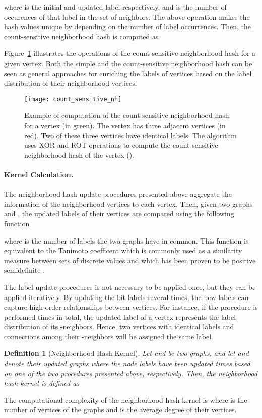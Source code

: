 \documentclass[twoside,11pt]{article}
\newtheorem{definition}{Definition}
\begin{document}
where  is the initial and updated label respectively, and  is the number of occurences of that label in the set of neighbors.
The above operation makes the hash values unique by depending on the number of label occurrences.
Then, the count-sensitive neighborhood hash is computed as

Figure~\ref{fig:count_sensitive_nh} illustrates the operations of the count-sensitive neighborhood hash for a given vertex.
Both the simple and the count-sensitive neighborhood hash can be seen as general approaches for enriching the labels of vertices based on the label distribution of their neighborhood vertices.

\begin{figure}[t]
  \centering
  \texttt{[image: count\_sensitive\_nh]}
  \caption{Example of computation of the count-sensitive neighborhood hash for a vertex (in green). The vertex has three adjacent vertices (in red). Two of these three vertices have identical labels. The algorithm uses XOR and ROT operations to compute the count-sensitive neighborhood hash of the vertex ().}
  \label{fig:count_sensitive_nh}
\end{figure}

\paragraph{Kernel Calculation.}
The neighborhood hash update procedures presented above aggregate the information of the neighborhood vertices to each vertex.
Then, given two graphs  and , the updated labels of their vertices are compared using the following function

where  is the number of labels the two graphs have in common.
This function is equivalent to the Tanimoto coefficent which is commonly used as a similarity measure between sets of discrete values and which has been proven to be positive semidefinite .

The label-update procedures is not necessary to be applied once, but they can be applied iteratively.
By updating the bit labels several times, the new labels can capture high-order relationships between vertices.
For instance, if the procedure is performed  times in total, the updated label  of a vertex  represents the label distribution of its -neighbors.
Hence, two vertices  with identical labels and connections among their -neighbors will be assigned the same label.

\begin{definition}[Neighborhood Hash Kernel]
	Let  and  be two graphs, and let  and  denote their updated graphs where the node labels have been updated  times based on one of the two procedures presented above, respectively.
	Then, the neighborhood hash kernel is defined as
	
\end{definition}
The computational complexity of the neighborhood hash kernel is  where  is the number of vertices of the graphs and  is the average degree of their vertices.
\end{document}
